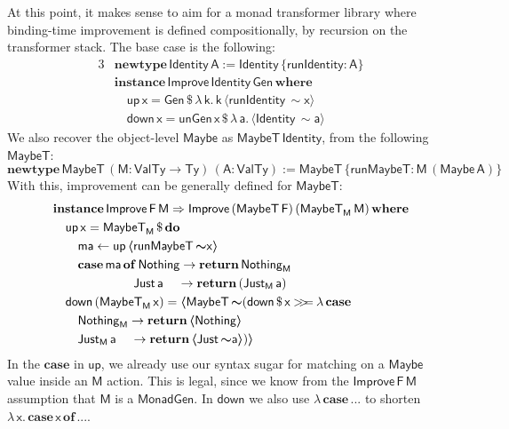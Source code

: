\documentclass[acmsmall,screen,review,anonymous]{acmart}
\newcommand{\mit}[1]{{\mathsf{#1}}}
\newcommand{\msf}[1]{{\mathsf{#1}}}
\newcommand{\mbf}[1]{{\mathbf{#1}}}
\newcommand{\bs}[1]{\boldsymbol{#1}}
\newcommand{\mdo}{\mbf{do}\,}
\newcommand{\ind}{\hspace{1em}}
\newcommand{\return}{\mbf{return}\,}
\newcommand{\lam}{\lambda\,}
\newcommand{\where}{\mbf{where}}
\newcommand{\M}{\msf{M}}
\newcommand{\of}{\mbf{of}\,}
\newcommand{\vma}{\mathsf{ma}}
\newcommand{\vk}{\mathsf{k}}
\newcommand{\vA}{\mathsf{A}}
\newcommand{\vF}{\mathsf{F}}
\newcommand{\vM}{\mathsf{M}}
\newcommand{\va}{\mathsf{a}}
\newcommand{\vx}{\mathsf{x}}
\newcommand{\fro}{\leftarrow}
\newcommand{\case}{\mbf{case\,}}
\newcommand{\spl}{{\bs{\sim}}}
\newcommand{\ql}{{\bs{\langle}}}
\newcommand{\qr}{{\bs{\rangle}}}
\newcommand{\bind}{\mathbin{>\!\!>\mkern-6.7mu=}}
\newcommand{\VTy}{\msf{ValTy}}
\newcommand{\Ty}{\msf{Ty}}
\newcommand{\Maybe}{\msf{Maybe}}
\newcommand{\MaybeT}{\msf{MaybeT}}
\newcommand{\Nothing}{\msf{Nothing}}
\newcommand{\Just}{\msf{Just}}
\theoremstyle{remark}
\newcommand{\mup}{\mit{up}}
\newcommand{\mdown}{\mit{down}}
\newcommand{\instance}{\mbf{instance}\,}
\newcommand{\Improve}{\msf{Improve}}
\newcommand{\Gen}{\msf{Gen}}
\newcommand{\unGen}{\mit{unGen}}
\newcommand{\qt}[1]{\ql#1\qr}
\newcommand{\MonadGen}{\msf{MonadGen}}
\newcommand{\RA}{\Rightarrow}
\newcommand{\Identity}{\msf{Identity}}
\newcommand{\runIdentity}{\mit{runIdentity}}
\newcommand{\newtype}{\mbf{newtype}\,}
\newcommand{\runMaybeT}{\mit{runMaybeT}}
\newcommand{\dlr}{\,\$\,}
\begin{document}
At this point, it makes sense to aim for a monad transformer library where
binding-time improvement is defined compositionally, by recursion on the
transformer stack. The base case is the following:
\begin{alignat*}{3}
  & \newtype \Identity\,\vA := \Identity\,\{\runIdentity : \vA\} \\
  & \instance \Improve\,\Identity\,\Gen\,\where\\
  & \ind \mup\,\vx = \Gen \dlr \lam \vk.\,\vk\,\qt{\runIdentity\,\spl \vx}\\
  & \ind \mdown\,\vx = \unGen\,\vx \dlr \lam \va.\,\qt{\Identity\,\spl \va}
\end{alignat*}
We also recover the object-level $\Maybe$ as $\MaybeT\,\Identity$, from the following $\MaybeT$:
\[ \newtype \MaybeT\,(\vM : \VTy \to \Ty)\,(\vA : \VTy) := \MaybeT\,\{\runMaybeT : \vM\,(\Maybe\,\vA)\} \]
With this, improvement can be generally defined for $\MaybeT$:
\begin{alignat*}{3}
  &\instance \Improve\,\vF\,\vM \RA \Improve\,(\MaybeT\,\vF)\,(\MaybeT_\M\,\vM)\,\where\\
  &\ind \mup\,\vx = \MaybeT_\M \dlr \mdo\\
  &\ind\ind \vma \fro \mup\,\qt{\runMaybeT\,\spl \vx}\\
  &\ind\ind \case \vma\,\of \Nothing \to \return \Nothing_\M\\
  &\hspace{6.5em}         \Just\,\va \hspace{1.15em}\to \return (\Just_\M\,\va)\\
  &\ind \mdown\,(\MaybeT_\M\,\vx) = \qt{\MaybeT\,\spl(\mdown \dlr \vx \bind \lam\case\\
  &\ind\ind\Nothing_\M \to \return \qt{\Nothing}\\
  &\ind\ind\Just_\M\,\va\hspace{1.15em} \to \return \qt{\Just\,\spl \va})}
\end{alignat*}
In the $\mbf{case}$ in $\mup$, we already use our syntax sugar for matching on a
$\Maybe$ value inside an $\vM$ action. This is legal, since we know from the
$\Improve\,\vF\,\vM$ assumption that $\vM$ is a $\MonadGen$. In $\mdown$ we also use
$\lam\case ...$ to shorten $\lam \vx.\,\case \vx\,\of ...$.
\end{document}
